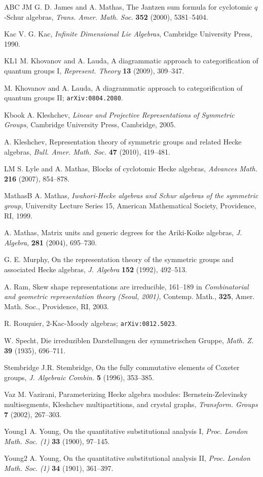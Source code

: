 \documentclass[twoside,11pt,reqno]{amsart}
\numberwithin{equation}{section}
\theoremstyle{definition}  %
\newcommand{\0}{{\bar 0}}
\newcommand{\1}{{\bar 1}}
\begin{document}
\begin{thebibliography}{ABC}
\bibitem%
{JM}
G. D. James and A. Mathas, The Jantzen sum formula for cyclotomic $q$-Schur algebras, {\em Trans. Amer. Math. Soc.} {\bf 352} (2000), 5381--5404. 


\bibitem%
{Kac} V. G. Kac, {\em Infinite Dimensional Lie Algebras}, Cambridge University Press, 1990. 


\bibitem%
{KL1}
M. Khovanov and A. Lauda,
A diagrammatic approach to categorification of quantum groups I, 
{\em Represent. Theory} {\bf 13} (2009), 309--347.


M. Khovanov and A. Lauda,
A diagrammatic approach to categorification of quantum groups II;
{\tt  arXiv:0804.2080}.


\bibitem%
{Kbook}
A. Kleshchev, {\em Linear and Projective Representations of Symmetric Groups}, Cambridge University Press, Cambridge, 2005. 

A. Kleshchev, Representation theory of symmetric groups and related Hecke algebras, {\em Bull. Amer. Math. Soc.} {\bf 47} (2010), 419--481. 


\bibitem%
{LM}
S. Lyle and A. Mathas, Blocks of cyclotomic Hecke algebras, {\em Advances Math.} {\bf 216}  (2007), 854--878.


\bibitem%
{MathasB}
A. Mathas, {\em Iwahori-Hecke algebras and Schur algebras of the symmetric group}, University Lecture Series 15,  American Mathematical Society, Providence, RI, 1999.

  A. Mathas, Matrix units and generic degrees for the {A}riki-{K}oike algebras, {\em J. Algebra},
  {\bf 281} (2004), 695--730.
  
G. E. Murphy, On the representation theory of the symmetric groups and associated Hecke algebras, {\em J. Algebra} {\bf 152} (1992), 492--513.

A. Ram, Skew shape representations are irreducible, 161--189 in {\em  Combinatorial and geometric representation theory (Seoul, 2001)}, Contemp. Math., {\bf 325}, Amer. Math. Soc., Providence, RI, 2003.


R. Rouquier, $2$-Kac-Moody algebras; {\tt arXiv:0812.5023}. 

W. Specht, Die irreduziblen Darstellungen der symmetrischen Gruppe, {\em Math.  Z.}  {\bf 39} (1935), 696--711.


\bibitem%
{Stembridge}
J.R. Stembridge, On the fully commutative elements of Coxeter groups, {\em J. Algebraic Combin.} {\bf 5} (1996), 353--385.


\bibitem%
{Vaz} M. Vazirani, 
Parameterizing Hecke algebra modules: Bernstein-Zelevinsky multisegments, Kleshchev multipartitions, and crystal graphs, {\em Transform. Groups} {\bf 7} (2002), 267--303.

\bibitem
{Young1}
A. Young, On the quantitative substitutional analysis I, {\em Proc. London Math. Soc. (1)} {\bf 33} (1900), 97--145.

\bibitem
{Young2}
A. Young, On the quantitative substitutional analysis II, {\em Proc. London Math. Soc. (1)} {\bf 34} (1901), 361--397.



\end{thebibliography}
\end{document}
